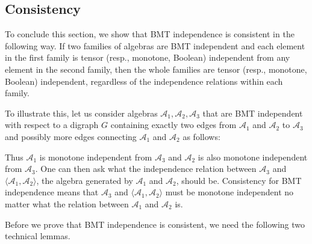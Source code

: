 \documentclass[a4paper,12pt]{extarticle}
\theoremstyle{definition}
\theoremstyle{remark}
\def\AA{\mathcal{A}}
\begin{document}

\subsection{Consistency}
%
To conclude this section, we show that BMT independence is consistent in the following way.     
%
If two families of algebras are BMT independent and each element in the first family is tensor (resp., monotone, Boolean) independent from any element in the second family, 
%
then the whole families are tensor (resp., monotone, Boolean) independent, regardless of the independence relations within each family.
%
%
%
%

To illustrate this, let us consider algebras $\mathcal{A}_1, \mathcal{A}_2, \mathcal{A}_3$ that are BMT independent with respect to a digraph $G$ containing exactly two edges from $\mathcal{A}_1$ and $\mathcal{A}_2$ to $\mathcal{A}_3$ and possibly more edges connecting $\AA_1$ and $\AA_2$ as follows: 
%
\begin{center} 
\end{center}
%
Thus $\mathcal{A}_1$ is monotone independent from $\mathcal{A}_3$ and $\mathcal{A}_2$ is also monotone independent from $\mathcal{A}_3$. 
%
One can then ask what the independence relation between $\mathcal{A}_3$ and $\langle \mathcal{A}_1, \mathcal{A}_2\rangle$, the algebra generated by $\mathcal{A}_1$ and $\mathcal{A}_2$, should be. 
%
Consistency for BMT independence means that $\mathcal{A}_3$ and $\langle \mathcal{A}_1, \mathcal{A}_2\rangle$ must be monotone independent no matter what the relation between $\mathcal{A}_1$ and $\mathcal{A}_2$ is.
%
%
%

Before we prove that BMT independence is consistent, we need the following two technical lemmas.
%
\end{document}
